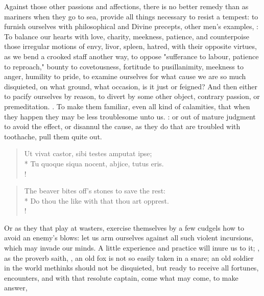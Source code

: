 {Against those other passions and affections, there is no better remedy than as mariners when they go to sea, provide all things necessary to resist a tempest: to furnish ourselves with philosophical and Divine precepts, other men's examples, : To balance our hearts with love, charity, meekness, patience, and counterpoise those irregular motions of envy, livor, spleen, hatred, with their opposite virtues, as we bend a crooked staff another way, to oppose "sufferance to labour, patience to reproach," bounty to covetousness, fortitude to pusillanimity, meekness to anger, humility to pride, to examine ourselves for what cause we are so much disquieted, on what ground, what occasion, is it just or feigned? And then either to pacify ourselves by reason, to divert by some other object, contrary passion, or premeditation. . To make them familiar, even all kind of calamities, that when they happen they may be less troublesome unto us. : or out of mature judgment to avoid the effect, or disannul the cause, as they do that are troubled with toothache, pull them quite out.

\begin{latin}%
\begin{verse}%
Ut vivat castor, sibi testes amputat ipse;\\*
Tu quoque siqua nocent, abjice, tutus eris.\\!
\end{verse}%
\end{latin}%
\translationrule%
\begin{verse}%
The beaver bites off's stones to save the rest:\\*
Do thou the like with that thou art opprest.\\!
\end{verse}%

Or as they that play at wasters, exercise themselves by a few cudgels how to avoid an enemy's blows: let us arm ourselves against all such violent incursions, which may invade our minds. A little experience and practice will inure us to it; , as the proverb saith, , an old fox is not so easily taken in a snare; an old soldier in the world methinks should not be disquieted, but ready to receive all fortunes, encounters, and with that resolute captain, come what may come, to make answer,

}
